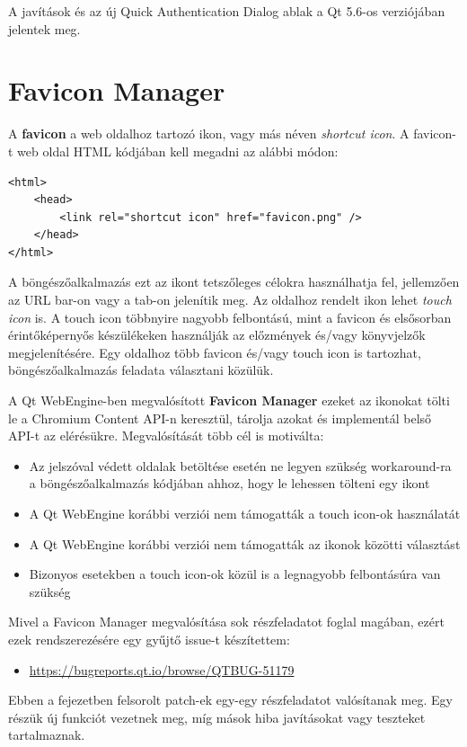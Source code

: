 \documentclass[12pt]{report}
\let\origurl\url
\renewcommand{\url}[1]{%
    \textcolor{blue}{\origurl{#1}}
}
\newcommand{\qtbug}[1]{%
    \textcolor{qtred}{\origurl{https://bugreports.qt.io/browse/QTBUG-#1}}
}
\begin{document}
A javítások és az új Quick Authentication Dialog ablak a Qt 5.6-os verziójában jelentek meg.
\newpage


\section{Favicon Manager}

\noindent
A \textbf{favicon} a web oldalhoz tartozó ikon, vagy más néven \textit{shortcut icon}. A
favicon-t web oldal HTML kódjában kell megadni az alábbi módon:
\begin{verbatim}
<html>
    <head>
        <link rel="shortcut icon" href="favicon.png" />
    </head>
</html>
\end{verbatim}
A böngészőalkalmazás ezt az ikont tetszőleges célokra használhatja fel, jellemzően az URL
bar-on vagy a tab-on jelenítik meg.
Az oldalhoz rendelt ikon lehet \textit{touch icon} is. A touch icon többnyire nagyobb
felbontású, mint a favicon és elsősorban érintőképernyős készülékeken használják az
előzmények és/vagy könyvjelzők megjelenítésére. Egy oldalhoz több favicon és/vagy touch icon
is tartozhat, böngészőalkalmazás feladata választani közülük.

A Qt WebEngine-ben megvalósított \textbf{Favicon Manager} ezeket az ikonokat tölti le a
Chromium Content API-n keresztül, tárolja azokat és implementál belső API-t az elérésükre.
Megvalósítását több cél is motiválta:
\begin{itemize}
    \item Az jelszóval védett oldalak betöltése esetén ne legyen szükség workaround-ra a
        böngészőalkalmazás kódjában ahhoz, hogy le lehessen tölteni egy ikont
    \item A Qt WebEngine korábbi verziói nem támogatták a touch icon-ok használatát
    \item A Qt WebEngine korábbi verziói nem támogatták az ikonok közötti választást
    \item Bizonyos esetekben a touch icon-ok közül is a legnagyobb felbontásúra van szükség
\end{itemize}

Mivel a Favicon Manager megvalósítása sok részfeladatot foglal magában, ezért ezek
rendszerezésére egy gyűjtő issue-t készítettem:
\begin{center}
    \begin{issuebox}
        \begin{itemize}
            \renewcommand{\labelitemi}{\textcolor{qtred}{$\blacktriangleright$}}
            \item \qtbug{51179}
        \end{itemize}
    \end{issuebox}
\end{center}
Ebben a fejezetben felsorolt patch-ek egy-egy részfeladatot valósítanak meg. Egy részük
új funkciót vezetnek meg, míg mások hiba javításokat vagy teszteket tartalmaznak.
\end{document}
